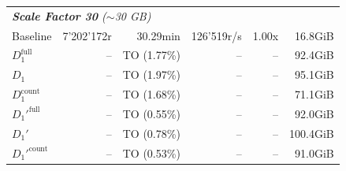 \begin{longtable}{lrrrrr}
    \multicolumn{6}{l}{\textit{\textbf{Scale Factor 30} ($\sim$30 GB)}} \\
    \nopagebreak
    Baseline              &  7'202'172r           &  30.29min            &  126'519r/s          & 1.00x             & 16.8GiB   \\
    $D_1^{\text{full}}$   &  --                   &  TO (1.77\%)         &  --                  & --                & 92.4GiB   \\
    \quad $D_1$           &  --                   &  TO (1.97\%)         &  --                  & --                & 95.1GiB   \\
    $D_1^{\text{count}}$  &  --                   &  TO (1.68\%)         &  --                  & --                & 71.1GiB   \\
    $D_1'^{\text{full}}$  &  --                   &  TO (0.55\%)         &  --                  & --                & 92.0GiB   \\
    \quad $D_1'$          &  --                   &  TO (0.78\%)         &  --                  & --                & 100.4GiB  \\
    $D_1'^{\text{count}}$ &  --                   &  TO (0.53\%)         &  --                  & --                & 91.0GiB   \\
    
    \bottomrule

\end{longtable}

